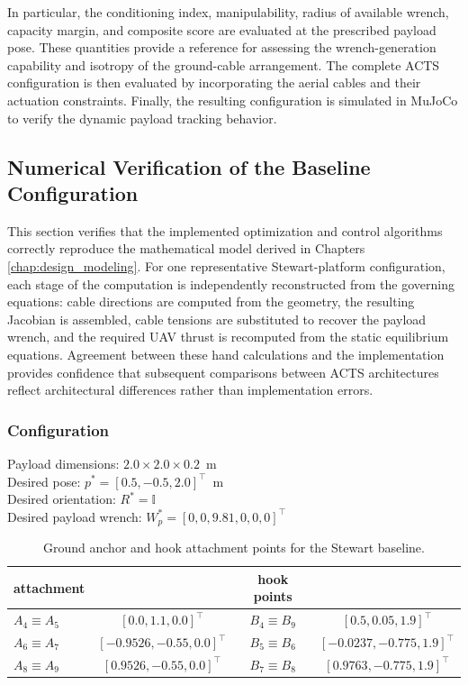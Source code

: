 In particular, the conditioning index, manipulability, radius of available wrench, capacity margin, and composite score are evaluated at the prescribed payload pose. These quantities provide a reference for assessing the wrench-generation capability and isotropy of the ground-cable arrangement. The complete ACTS configuration is then evaluated by incorporating the aerial cables and their actuation constraints. Finally, the resulting configuration is simulated in MuJoCo to verify the dynamic payload tracking behavior.

\subsection{Numerical Verification of the Baseline Configuration}
This section verifies that the implemented optimization and control algorithms correctly reproduce the mathematical model derived in Chapters \ref{chap:design_modeling}. For one representative Stewart-platform configuration, each stage of the computation is independently reconstructed from the governing equations: cable directions are computed from the geometry, the resulting Jacobian is assembled, cable tensions are substituted to recover the payload wrench, and the required UAV thrust is recomputed from the static equilibrium equations. Agreement between these hand calculations and the implementation provides confidence that subsequent comparisons between ACTS architectures reflect architectural differences rather than implementation errors.

\subsubsection{Configuration}
Payload dimensions: $2.0 \times 2.0 \times 0.2$~m \\
Desired pose: $p^*= [0.5, -0.5, 2.0]^\top$~m \\
Desired orientation: $R^* = \mathbb{I}$ \\
Desired payload wrench: $W_p^* = [0, 0, 9.81, 0, 0, 0]^\top$

\begin{table}[h]
    \centering
    \begin{tabular}{lccc}
        attachment        &    & hook points & \\ \hline
        $A_4 \equiv A_5$ &  $[0.0, 1.1, 0.0]^\top$         &   $B_4 \equiv B_9$ &  $[0.5, 0.05, 1.9]^\top$          \\
        $A_6 \equiv A_7$ &  $[-0.9526, -0.55, 0.0]^\top$   &   $B_5 \equiv B_6$ &  $[-0.0237, -0.775, 1.9]^\top$    \\
        $A_8 \equiv A_9$ &  $[0.9526, -0.55, 0.0]^\top$    &   $B_7 \equiv B_8$ &  $[0.9763, -0.775, 1.9]^\top$     \\
    \end{tabular}
    \caption{Ground anchor and hook attachment points for the Stewart baseline.}
    \label{tab:groundAttachments}
\end{table}

